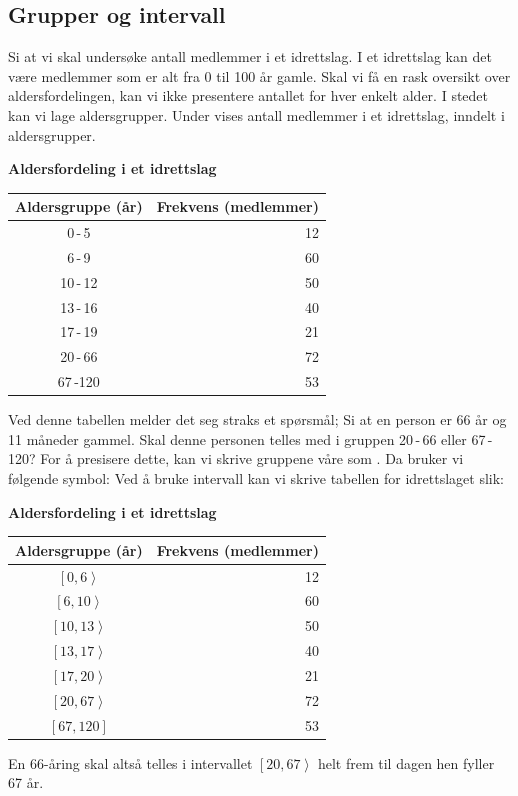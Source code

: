 \subsection*{Grupper og intervall}
Si at vi skal undersøke antall medlemmer i et idrettslag. I et idrettslag kan det være medlemmer som er alt fra 0 til 100 år gamle. Skal vi få en rask oversikt over aldersfordelingen, kan vi ikke presentere antallet for hver enkelt alder. I stedet kan vi lage aldersgrupper. Under vises antall medlemmer i et idrettslag, inndelt i aldersgrupper.
\begin{center}
	\textbf{Aldersfordeling i et idrettslag}
	\begin{tabular}{|c|r|}
		\hline
		Aldersgruppe (år) & Frekvens (medlemmer) \\ \hline
		0\,-\,5& 12\\ \hline
		6\,-\,9	& 60\\ \hline
		10\,-\,12  &	50\\ \hline
		13\,-\,16  &	40\\ \hline
		17\,-\,19  &	21\\ \hline
		20\,-\,66  &	72 \\ \hline
		67\,-120 & 53  \\ \hline
	\end{tabular}
\end{center}
Ved denne tabellen melder det seg straks et spørsmål; Si at en person er 66 år og 11 måneder gammel. Skal denne personen telles med i gruppen 20\,-\,66 eller 67\,-\,120? For å presisere dette, kan vi skrive gruppene våre som . Da bruker vi følgende symbol:
\eks{
0 er i intervallet $\left[0, 6\right\rangle$.\os 
5,99999 er i intervallet $\left[0, 6\right\rangle$. \os
6 er ikke i intervallet $\left[0, 6\right\rangle$.\os
}
\newpage
Ved å bruke intervall kan vi skrive tabellen for idrettslaget slik:
\begin{center}
	\textbf{Aldersfordeling i et idrettslag}
	\begin{tabular}{|c|r|}
		\hline
		Aldersgruppe (år) & Frekvens (medlemmer) \\ \hline
		$\left[0, 6\right\rangle$& 12\\ \hline
		$\left[6, 10\right\rangle$	& 60\\ \hline
		$\left[10, 13\right\rangle$  &	50\\ \hline
		$\left[13, 17\right\rangle$  &	40\\ \hline
		$\left[17, 20\right\rangle$  &	21\\ \hline
		$\left[20, 67\right\rangle$  &	72 \\ \hline
		$\left[67, 120\right]$ & 53  \\ \hline
	\end{tabular}
\end{center}
\label{sportstable}
En 66-åring skal altså telles i intervallet $\left[20, 67\right\rangle$ helt frem til dagen hen fyller 67 år.

